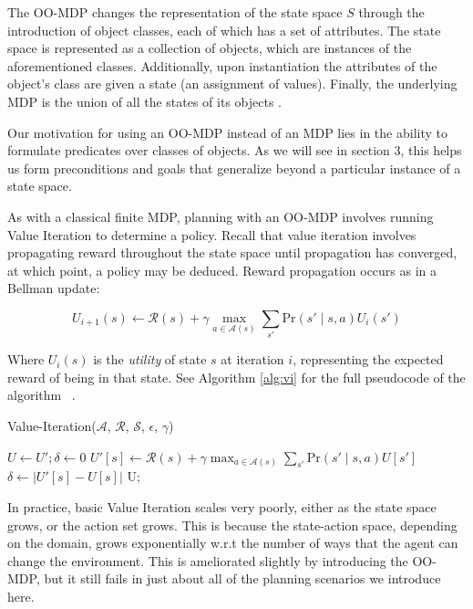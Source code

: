 \documentclass[]{article}
\begin{document}
The OO-MDP changes the representation of the state space 
$S$ through the introduction of object classes, each of which 
has a set of attributes. The state space is represented as a 
collection of objects, which are instances of the aforementioned 
classes. Additionally, upon instantiation the attributes of the 
object's class are given a state (an assignment of values). 
Finally, the underlying MDP is the union of all the states of its 
objects \citep{diuk08}.

Our motivation for using an OO-MDP instead of an MDP
lies in the ability to formulate predicates over classes of 
objects. As we will see in section 3, this helps us form 
preconditions and goals that generalize beyond a particular
instance of a state space.

As with a classical finite MDP, planning with an OO-MDP 
involves running Value Iteration to determine a policy. 
Recall that value iteration involves propagating reward 
throughout the state space until propagation has converged, 
at which point, a policy may be deduced. Reward propagation
occurs as in a Bellman update:

\begin{equation}
U_{i+1}(s) \leftarrow \mathcal{R}(s) + \gamma \max_{a \in \mathcal{A}(s)} \sum_{s'} \text{Pr}(s' \mid s, a)U_i(s')
\end{equation}

Where $U_i(s)$ is the {\it utility} of state $s$ at iteration $i$, 
representing the expected reward of being in that state. See Algorithm \ref{alg:vi} for the full pseudocode of the algorithm ~\citep{russellnorvigAI}.

\begin{algorithm}
  \caption{Value-Iteration($\mathcal{A}$, $\mathcal{R}$, $\mathcal{S}$, $\epsilon$, $\gamma$)}
  \begin{algorithmic}[1]
    \State $U \gets U';\delta \gets 0$
    \State $U'[s] \leftarrow \mathcal{R}(s) + \gamma \max_{a \in \mathcal{A}(s)} \sum_{s'} \text{Pr}(s'\mid s,a) U[s']$
    	\State $\delta \gets |U'[s] - U[s]|$ 
    \EndIf
    \EndFor
    \EndWhile
    \Return U;
  \end{algorithmic}
  \label{alg:vi}
\end{algorithm}


In practice, basic Value Iteration scales very poorly, either as the state 
space grows, or the action set grows. This is because the state-action 
space, depending on the domain, grows exponentially w.r.t the number 
of ways that the agent can change the environment. This is ameliorated 
slightly by introducing the OO-MDP, but it still fails in just about all of 
the planning scenarios we introduce here.
\end{document}
